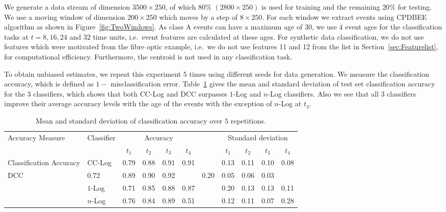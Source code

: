 \documentclass[a4paper,11pt]{article}
\newif\ifxyz
\let\ifxyz\iffalse
\begin{document}
We generate a data stream of dimension $3500 \times 250$, of which $80\%$ $(2800 \times 250)$ is used for training and the remaining $20\%$ for testing. We use a moving window  of dimension $200 \times 250$ which moves by a step of $8 \times 250$. For each window we extract events  using CPDBEE algorithm as shown in Figure~\ref{fig:TwoWindows}. As class A events can have a maximum age of $30$, we use $4$ event ages for the classification tasks at $t = 8, 16, 24$ and $32$ time units, i.e.\ event features are calculated at these ages. For synthetic data classification, we do not use features which were motivated from the fibre optic example, i.e.\ we do not use features 11 and 12 from the list in Section~\ref{sec:Featurelist}, for computational efficiency. Furthermore, the centroid is not used in any classification task.

To obtain unbiased estimates, we repeat this experiment $5$ times using different seeds for data generation. We measure the classification accuracy, which is defined as $1 - $ misclassification error. Table~\ref{tab:Results_Synthetic} gives the mean and standard deviation of test set classification accuracy for the 3 classifiers, which shows that \ifxyz both \fi CC-Log \ifxyz and DCC \fi surpasses $1$-Log and $n$-Log classifiers. Also we see that all 3 classifiers improve their average accuracy levels with the age of the events with the exception of $n$-Log at $t_4$.

\begin{table}[!ht]
	\centering
	\begin{tabular}{llccccccccc}
		\toprule
		Accuracy Measure        & Classifier & \multicolumn{4}{c}{Accuracy} &       & \multicolumn{4}{c}{Standard deviation}                                                \\
		\cmidrule{3-6} \cmidrule{8-11}
		                        &            & $t_1$                        & $t_2$ & $t_3$                                  & $t_4$ &      & $t_1$ & $t_2$ & $t_3$ & $t_4$ \\
		\midrule
		Classification Accuracy & CC-Log     & 0.79                         & 0.88  & 0.91                                   & 0.91  &      & 0.13  & 0.11  & 0.10  & 0.08  \\
		\ifxyz   DCC            & 0.72       & 0.89                         & 0.90  & 0.92                                   &       & 0.20 & 0.05  & 0.06  & 0.03          \\ \fi
		                        & $1$-Log    & 0.71                         & 0.85  & 0.88                                   & 0.87  &      & 0.20  & 0.13  & 0.13  & 0.11  \\
		                        & $n$-Log    & 0.76                         & 0.84  & 0.89                                   & 0.51  &      & 0.12  & 0.11  & 0.07  & 0.28  \\

		\bottomrule
	\end{tabular}
	\caption{Mean and standard deviation of classification accuracy over $5$ repetitions.}
  \label{tab:Results_Synthetic}
\end{table}
\end{document}
